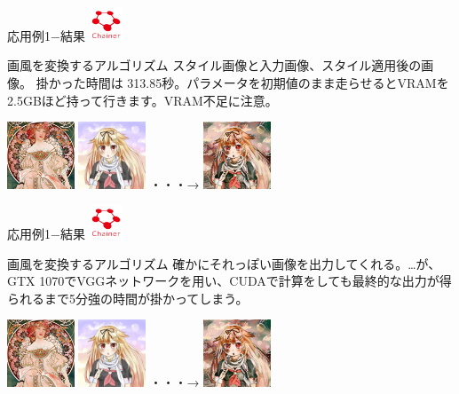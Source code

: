 \documentclass[12pt, unicode]{beamer}
\begin{document}
\begin{frame}{応用例1−結果}
\includegraphics[clip,width=1.0cm]{image/chainer_logo.png}
\begin{block}{画風を変換するアルゴリズム}
スタイル画像と入力画像、スタイル適用後の画像。
掛かった時間は 313.85秒。パラメータを初期値のまま走らせるとVRAMを2.5GBほど持って行きます。VRAM不足に注意。
\end{block}
\includegraphics[clip,width=2.0cm]{image/style_6.png}
\includegraphics[clip,width=2.0cm]{image/yuudachi_400x400.png}
・・・→
\includegraphics[clip,width=2.0cm]{image/im_04950.png}
\end{frame}

\begin{frame}{応用例1−結果}
\includegraphics[clip,width=1.0cm]{image/chainer_logo.png}
\begin{block}{画風を変換するアルゴリズム}
確かにそれっぽい画像を出力してくれる。…が、GTX 1070でVGGネットワークを用い、CUDAで計算をしても最終的な出力が得られるまで5分強の時間が掛かってしまう。
\end{block}
\includegraphics[clip,width=2.0cm]{image/style_6.png}
\includegraphics[clip,width=2.0cm]{image/yuudachi_400x400.png}
・・・→
\includegraphics[clip,width=2.0cm]{image/im_04950.png}
\end{frame}
\end{document}
